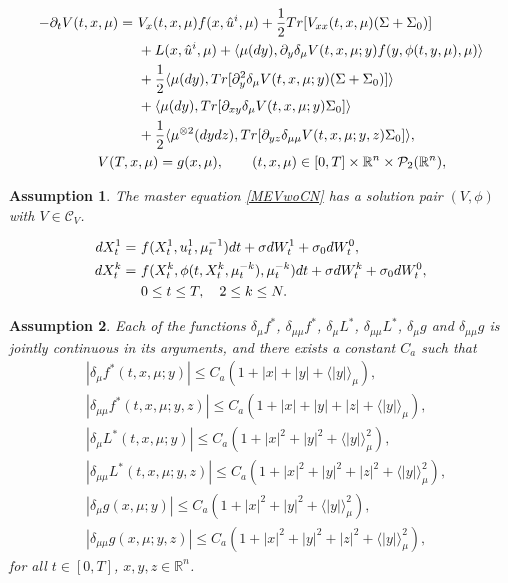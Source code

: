 \documentclass[10pt,a4paper]{amsart}
\newtheorem{assumption}{Assumption}
\def\cal{\mathcal}
\begin{document}
\begin{align}
- \partial_t V(t, x, \mu)
= \ &   V_x (t, x, \mu)
f(x, \hat u^i, \mu) + \frac{1}{2} {\rm Tr}
[ V_{xx}(t, x, \mu) (\Sigma+\Sigma_0)  ]
\label{MEVwoCN}   \\
&+ L(x, \hat u^i, \mu)  + \langle \mu(dy),  \partial_y\delta_\mu V(t,x, \mu; y) f( y, \phi(t, y, \mu),\mu)\rangle \notag  \\
&+\frac{1}{2} \langle \mu(dy), {\rm Tr}[
\partial_{y}^2 \delta_\mu
V(t, x, \mu; y) (\Sigma+\Sigma_0)]\rangle \notag \\
&+\langle \mu(dy),  {\rm Tr} [ \partial_{xy}\delta_\mu V(t,x, \mu;y)  \Sigma_0 ]\rangle \notag  \\
&+\frac{1}{2}\langle \mu^{\otimes 2}(dydz),  {\rm Tr}[\partial_{yz}\delta_{\mu\mu} V (t, x, \mu;y, z)
\Sigma_0]\rangle ,\notag\\
&\hskip -1cmV(T, x, \mu)=g(x,\mu),\qquad (t,x,\mu)\in[0,T]\times \mathbb{R}^{n}\times
 {\cal P}_2(\mathbb{R}^n), \label{vtcg}
\end{align}

\begin{assumption}\label{assum:meV}
The master equation \eqref{MEVwoCN} has a solution pair $(V, \phi)$ with $V\in {\cal C}_V$.
\end{assumption}

\begin{align}
dX_t^1=\ & f(X_t^1, u_t^1, \mu_{t}^{-1})dt+
\sigma dW_t^1+\sigma_0 dW_t^0,  \label{X1u} \\
dX_t^k=\ & f(X_t^k, \phi(t, X_t^k,\mu_t^{-k}), \mu_{t}^{-k})dt+
\sigma dW_t^k +\sigma_0 dW_t^0 ,   \label{Xkuhat} \\
& 0\le t\le T, \quad 2\le k\le N.   \notag
\end{align}

\begin{assumption}\label{assum:flg}
Each of the functions $ \delta_\mu f^*$, $ \delta_{\mu\mu} f^*$, $ \delta_\mu L^*$, $ \delta_{\mu\mu} L^*$, $ \delta_\mu g$ and $ \delta_{\mu\mu} g$ is jointly continuous in its arguments, and
there exists a constant $C_a$ such that
\begin{align*}
&|\delta_\mu f^*(t, x, \mu;y)| \le C_a(1+|x|+ |y|+\langle |y| \rangle_{\mu}  ),   \\
& |\delta_{\mu\mu} f^*(t, x, \mu;y,z)| \le C_a(1+|x|+ |y|+|z|+\langle |y| \rangle_{\mu}   ),    \\
 &|\delta_{\mu} L^*(t, x, \mu; y) |\le C_a(1+|x|^2+ |y|^2+\langle |y| \rangle_{\mu}^2),\\
&|\delta_{\mu\mu} L^*(t, x, \mu; y,z) |\le C_a(1+|x|^2+ |y|^2+|z|^2+\langle |y| \rangle_{\mu}^2),\\
&|\delta_{\mu} g( x, \mu; y) |\le C_a(1+ |x|^2+|y|^2+\langle |y| \rangle_{\mu}^2),\\
& |\delta_{\mu\mu} g( x, \mu; y,z) |\le C_a(1+ |x|^2+|y|^2+|z|^2+\langle |y| \rangle_{\mu}^2),
\end{align*}
for all $t\in [0,T]$, $x,y,z\in\mathbb{R}^n $.
\end{assumption}
\end{document}
